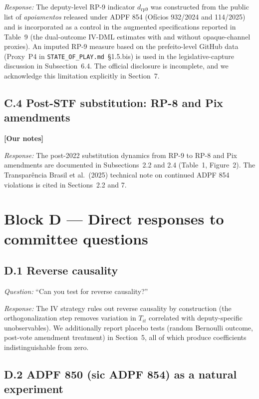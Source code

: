 \documentclass[11pt]{article}
\newcommand{\committee}[1]{\textbf{[#1]}}
\begin{document}
\noindent\emph{Response:} The deputy-level RP-9 indicator $d_{\mathrm{rp9}}$
was constructed from the public list of \emph{apoiamentos}
released under ADPF 854 (Ofícios 932/2024 and 114/2025) and is
incorporated as a control in the augmented specifications reported in
Table~9 (the dual-outcome IV-DML estimates with and without
opaque-channel proxies). An imputed RP-9 measure based on the
prefeito-level GitHub data (Proxy~P4 in
\texttt{STATE\_OF\_PLAY.md}~\S1.5.bis) is used in the legislative-capture
discussion in Subsection~6.4. The official disclosure is
incomplete, and we acknowledge this limitation explicitly in Section~7.

\subsection*{C.4 \quad Post-STF substitution: RP-8 and Pix amendments}
\committee{Our notes}

\noindent\emph{Response:} The post-2022 substitution dynamics from RP-9 to
RP-8 and Pix amendments are documented in Subsections~2.2 and 2.4
(Table~1, Figure~2). The Transparência Brasil et al.~(2025)
technical note on continued ADPF 854 violations is cited in
Sections~2.2 and 7.

\section{Block D — Direct responses to committee questions}

\subsection*{D.1 \quad Reverse causality}

\noindent\emph{Question:} ``Can you test for reverse causality?''

\noindent\emph{Response:} The IV strategy rules out reverse causality by
construction (the orthogonalization step removes variation in
$T_{it}$ correlated with deputy-specific unobservables). We additionally
report placebo tests (random Bernoulli outcome, post-vote amendment
treatment) in Section~5, all of which produce coefficients indistinguishable
from zero.

\subsection*{D.2 \quad ADPF 850 (sic ADPF 854) as a natural experiment}
\end{document}
